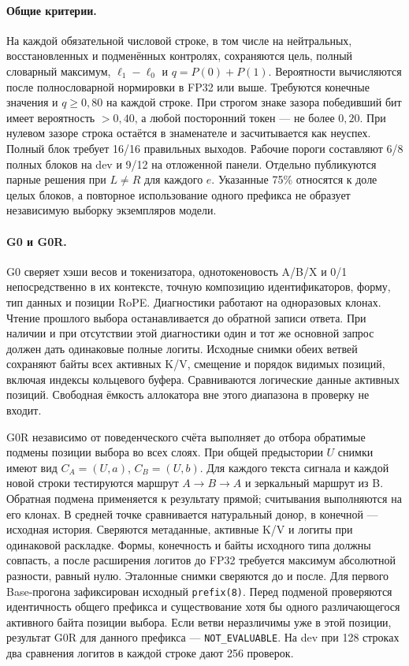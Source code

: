 \paragraph{Общие критерии.}
На каждой обязательной числовой строке, в том числе на нейтральных,
восстановленных и подменённых контролях, сохраняются цель, полный
словарный максимум, $\ell_1-\ell_0$ и $q=P(0)+P(1)$. Вероятности
вычисляются после полнословарной нормировки в FP32 или выше. Требуются
конечные значения и $q\ge 0{,}80$ на каждой строке. При строгом знаке
зазора победивший бит имеет вероятность $>0{,}40$, а любой посторонний
токен --- не более $0{,}20$. При нулевом зазоре строка остаётся в
знаменателе и засчитывается как неуспех. Полный блок требует 16/16
правильных выходов. Рабочие пороги составляют 6/8 полных блоков на dev
и 9/12 на отложенной панели. Отдельно публикуются парные решения при
$L\ne R$ для каждого $e$. Указанные 75\% относятся к доле целых блоков,
а повторное использование одного префикса не образует независимую выборку
экземпляров модели.

\paragraph{G0 и G0R.}
G0 сверяет хэши весов и токенизатора, однотокеновость A/B/X и
0/1 непосредственно в их контексте, точную композицию идентификаторов,
форму, тип данных и позиции RoPE. Диагностики работают на одноразовых
клонах. Чтение прошлого выбора останавливается до обратной записи ответа.
При наличии и при отсутствии этой диагностики один и тот же основной запрос
должен дать одинаковые полные логиты. Исходные снимки обеих ветвей сохраняют
байты всех активных K/V, смещение и порядок видимых позиций, включая индексы
кольцевого буфера. Сравниваются логические данные активных позиций. Свободная
ёмкость аллокатора вне этого диапазона в проверку не входит.

G0R независимо от поведенческого счёта выполняет до отбора обратимые подмены
позиции выбора во всех слоях. При общей предыстории $U$ снимки имеют вид
$C_A=(U,a)$, $C_B=(U,b)$. Для каждого текста сигнала и каждой новой строки
тестируются маршрут $A\to B\to A$ и зеркальный маршрут из B.
Обратная подмена применяется к результату прямой; считывания выполняются на
его клонах. В средней точке сравнивается натуральный донор, в конечной ---
исходная история. Сверяются метаданные, активные K/V и логиты при одинаковой
раскладке. Формы, конечность и байты исходного типа должны совпасть, а после
расширения логитов до FP32 требуется максимум абсолютной разности,
равный нулю. Эталонные снимки сверяются до и после. Для первого Base-прогона
зафиксирован исходный \texttt{prefix(8)}. Перед подменой проверяются
идентичность общего префикса и существование хотя бы одного различающегося
активного байта позиции выбора. Если ветви неразличимы уже в этой позиции,
результат G0R для данного префикса --- \texttt{NOT\_EVALUABLE}.
На dev при 128 строках два сравнения логитов в каждой строке дают 256
проверок.

